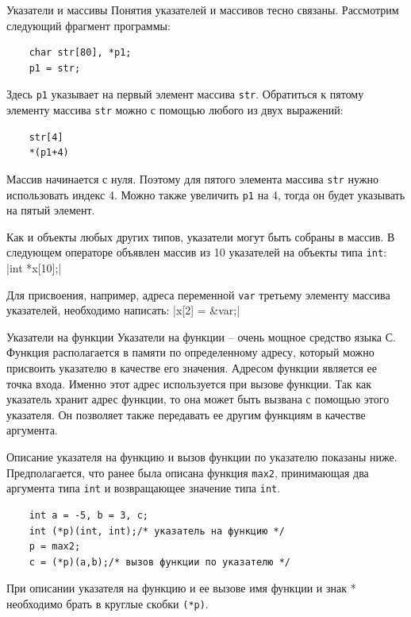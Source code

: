 \documentclass{beamer}
\begin{document}
\begin{frame}[fragile]{Указатели и массивы}
    Понятия указателей и массивов тесно связаны. Рассмотрим следующий фрагмент программы:
    \begin{verbatim}
    char str[80], *p1;
    p1 = str;
    \end{verbatim}
    
    Здесь \texttt{p1} указывает на первый элемент массива \texttt{str}. Обратиться к пятому элементу массива \texttt{str} можно с помощью любого из двух выражений:
    \begin{verbatim}
    str[4]
    *(p1+4)
    \end{verbatim}
    
    Массив начинается с нуля. Поэтому для пятого элемента массива \texttt{str} нужно использовать индекс 4. Можно также увеличить \texttt{p1} на 4, тогда он будет указывать на пятый элемент.
    
    \medskip
    Как и объекты любых других типов, указатели могут быть собраны в массив. В следующем операторе объявлен массив из 10 указателей на объекты типа \texttt{int}:
    |int *x[10];|
    
    Для присвоения, например, адреса переменной \texttt{var} третьему элементу массива указателей, необходимо написать: \qquad {}|x[2] = &var;|
\end{frame}

\begin{frame}[fragile]{Указатели на функции}
    Указатели на функции – очень мощное средство языка С. Функция
    располагается в памяти по определенному адресу, который можно присвоить указателю в качестве его значения. Адресом функции является ее точка входа. Именно этот адрес используется при вызове функции. Так как указатель хранит адрес функции, то она может быть вызвана с помощью этого указателя. Он позволяет также передавать ее другим функциям в качестве аргумента.
    
    \medskip
    Описание указателя на функцию и вызов функции по указателю показаны ниже. Предполагается, что ранее была описана функция \texttt{max2}, принимающая два аргумента типа \texttt{int} и возвращающее значение типа \texttt{int}.
    
    \medskip
    \begin{verbatim}
    int a = -5, b = 3, c;
    int (*p)(int, int);/* указатель на функцию */
    p = max2;
    c = (*p)(a,b);/* вызов функции по указателю */
    \end{verbatim}
    
    \medskip
    При описании указателя на функцию и ее вызове имя функции и знак * необходимо брать в круглые скобки \texttt{(*p)}.
\end{frame}
\end{document}
